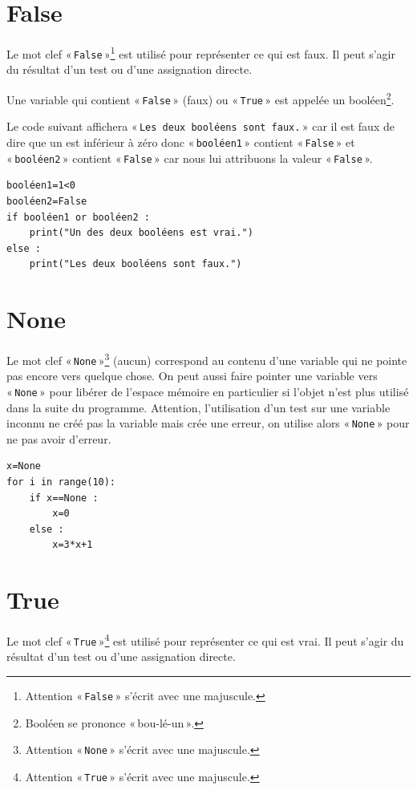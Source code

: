 \section*{False}
Le mot clef « \texttt{False} »\footnote{Attention « \texttt{False} » s'écrit avec une majuscule.} est utilisé pour représenter ce qui est faux. Il peut s'agir du résultat d'un test ou d'une assignation directe.

Une variable qui contient « \texttt{False} » (faux) ou « \texttt{True} » est appelée un booléen\footnote{Booléen se prononce « bou-lé-un ».}.  

Le code suivant affichera « \texttt{Les deux booléens sont faux.} » car il est faux de dire que un est inférieur à zéro donc « \texttt{booléen1} » contient « \texttt{False} » et « \texttt{booléen2} » contient « \texttt{False} » car nous lui attribuons la valeur « \texttt{False} ».
  
\begin{Verbatim}[frame=single,rulecolor=\color{gray}]
booléen1=1<0
booléen2=False
if booléen1 or booléen2 :
    print("Un des deux booléens est vrai.")
else :
	print("Les deux booléens sont faux.")
\end{Verbatim}

\section*{None}
Le mot clef « \texttt{None} »\footnote{Attention « \texttt{None} » s'écrit avec une majuscule.} (aucun) correspond au contenu d'une variable qui ne pointe pas encore vers quelque chose. On peut aussi faire pointer une variable vers « \texttt{None} » pour libérer de l'espace mémoire en particulier si l'objet n'est plus utilisé dans la suite du programme. Attention, l'utilisation d'un test sur une variable inconnu ne créé pas la variable mais crée une erreur, on utilise alors « \texttt{None} » pour ne pas avoir d'erreur.


\begin{Verbatim}[frame=single,rulecolor=\color{gray}]
x=None
for i in range(10):
    if x==None :
        x=0
    else :
        x=3*x+1
\end{Verbatim}
 
\section*{True}
Le mot clef « \texttt{True} »\footnote{Attention « \texttt{True} » s'écrit avec une majuscule.} est utilisé pour représenter ce qui est vrai. Il peut s'agir du résultat d'un test ou d'une assignation directe.

